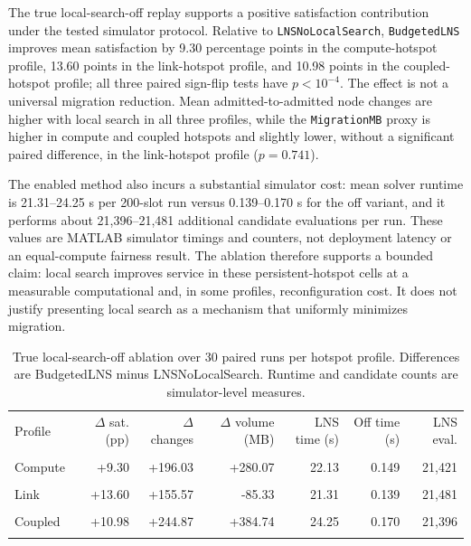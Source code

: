 \documentclass[preprint,12pt]{elsarticle}
\begin{document}
The true local-search-off replay supports a positive satisfaction contribution
under the tested simulator protocol. Relative to \texttt{LNSNoLocalSearch},
\texttt{BudgetedLNS} improves mean satisfaction by 9.30 percentage points
in the compute-hotspot profile, 13.60 points in the link-hotspot profile, and
10.98 points in the coupled-hotspot profile; all three paired sign-flip tests
have $p<10^{-4}$. The effect is not a universal migration reduction. Mean
admitted-to-admitted node changes are higher with local search in all three
profiles, while the \texttt{MigrationMB} proxy is higher in compute and coupled
hotspots and slightly lower, without a significant paired difference, in the
link-hotspot profile ($p=0.741$).

The enabled method also incurs a substantial simulator cost: mean solver
runtime is 21.31--24.25 s per 200-slot run versus 0.139--0.170 s for the
off variant, and it performs about 21,396--21,481 additional candidate
evaluations per run. These values are MATLAB simulator timings and counters,
not deployment latency or an equal-compute fairness result. The ablation
therefore supports a bounded claim: local search improves service in these
persistent-hotspot cells at a measurable computational and, in some profiles,
reconfiguration cost. It does not justify presenting local search as a
mechanism that uniformly minimizes migration.

\begin{table}[H]
\centering
\caption{True local-search-off ablation over 30 paired runs per hotspot profile. Differences are BudgetedLNS minus LNSNoLocalSearch. Runtime and candidate counts are simulator-level measures.}
\label{tab:local-search-off}
\scriptsize
\setlength{\tabcolsep}{4pt}
\begin{tabular}{lrrrrrr}
\toprule
Profile & $\Delta$ sat. (pp) & $\Delta$ changes & $\Delta$ volume (MB) & LNS time (s) & Off time (s) & LNS eval. \\\\
\midrule
Compute & +9.30 & +196.03 & +280.07 & 22.13 & 0.149 & 21,421\\\\
Link & +13.60 & +155.57 & -85.33 & 21.31 & 0.139 & 21,481\\\\
Coupled & +10.98 & +244.87 & +384.74 & 24.25 & 0.170 & 21,396\\\\
\bottomrule
\end{tabular}
\end{table}
\end{document}
